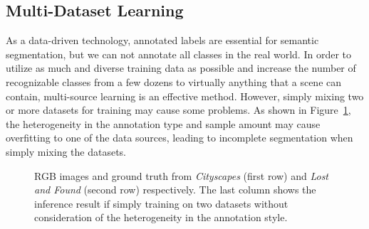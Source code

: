 \documentclass[letterpaper, 10 pt, journal, twoside]{ieeetran}
\begin{document}
\subsection{Multi-Dataset Learning}
As a data-driven technology, annotated labels are essential for semantic segmentation, but we can not annotate all classes in the real world. In order to utilize as much and diverse training data as possible and increase the number of recognizable classes from a few dozens to virtually anything that a scene can contain, multi-source learning is an effective method.
However, simply mixing two or more datasets for training may cause some problems.
As shown in Figure~\ref{fig:mix_directly}, the heterogeneity in the annotation type and sample amount may cause overfitting to one of the data sources, leading to incomplete segmentation when simply mixing the datasets. 

\begin{figure}[ht]
    \centering {}\hspace{-6pt}  \hspace{-6pt}
    \hspace{-6pt}
\caption{RGB images and ground truth from \textit{Cityscapes} (first row) and \textit{Lost and Found} (second row) respectively. The last column shows the inference result if simply training on two datasets without consideration of the heterogeneity in the annotation style.}
    \label{fig:mix_directly}
\end{figure}
\end{document}
